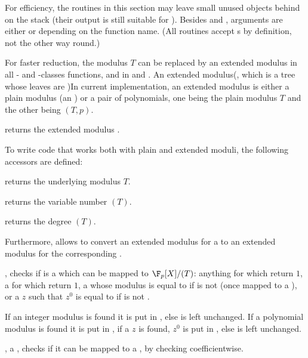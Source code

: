 For efficiency, the routines in this section may leave small unused objects
behind on the stack (their output is still suitable for ).
Besides  and , arguments are either  or 
depending on the function name. (All  routines accept s by
definition, not the other way round.)


For faster reduction, the modulus $T$ can be replaced by an extended modulus
in all - and -classes functions, and in  and
. An extended modulus(, which is a tree whose leaves are )In
current implementation, an extended modulus is either a plain modulus (an
) or a pair of polynomials, one being the plain modulus $T$ and the
other being $(T,p)$.

 returns the extended modulus .

To write code that works both with plain and extended moduli, the following
accessors are defined:

 returns the underlying modulus $T$.

 returns the variable number $(T)$.

 returns the degree $(T)$.

Furthermore,  allows to convert an extended modulus for
a  to an extended modulus for the corresponding .


, checks if  is a 
which can be mapped to $\F_p[X]/(T)$: anything for which  return
$1$, a  for which  return $1$, a 
whose modulus is equal to  if  is not  (once mapped
to a ), or a  $z$ such that $z^0$ is equal to 
if  is not .

If an integer modulus is found it is put in , else  is left
unchanged. If a polynomial modulus is found it is put in ,
if a  $z$ is found, $z^0$ is put in , else
 is left unchanged.

,  a ,
checks if it can be mapped to a , by checking 
coefficientwise.

